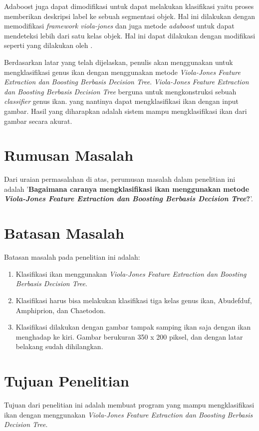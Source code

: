 Adaboost juga dapat dimodifikasi untuk dapat melakukan klasifikasi yaitu proses 
memberikan deskripsi label ke sebuah segmentasi objek. Hal ini dilakukan dengan 
memodifikasi \textit{framework viola-jones} dan juga metode \textit{adaboost} untuk 
dapat mendeteksi lebih dari satu kelas objek. Hal ini dapat dilakukan dengan modifikasi 
seperti yang dilakukan oleh \cite{samme}.

Berdasarkan latar yang telah dijelaskan, penulis akan menggunakan untuk mengklasifikasi
genus ikan dengan menggunakan metode \emph{Viola-Jones Feature Extraction dan Boosting Berbasis 
	Decision Tree}. 
\emph{Viola-Jones Feature Extraction dan Boosting Berbasis 
	Decision Tree} berguna untuk 
mengkonstruksi sebuah \emph{classifier} genus ikan. yang nantinya dapat mengklasifikasi 
ikan dengan input gambar. Hasil yang diharapkan adalah sistem 
mampu mengklasifikasi ikan dari gambar secara akurat.

\section{Rumusan Masalah}
Dari uraian permasalahan di atas, perumusan masalah dalam penelitian ini adalah 
'\textbf{Bagaimana caranya mengklasifikasi ikan menggunakan metode 
\textit{Viola-Jones Feature Extraction dan Boosting Berbasis 
	Decision Tree}?}'.

\section{Batasan Masalah}
Batasan masalah pada penelitian ini adalah:
\begin{enumerate}
	\item Klasifikasi ikan menggunakan \textit{Viola-Jones Feature Extraction dan Boosting Berbasis 
	Decision Tree}.
	\item Klasifikasi harus bisa melakukan klasifikasi tiga kelas genus ikan, Abudefduf, Amphiprion, dan Chaetodon.
	\item Klasifikasi dilakukan dengan gambar tampak samping ikan saja dengan ikan menghadap ke kiri. Gambar 
	berukuran 350 x 200 piksel, dan dengan latar belakang sudah dihilangkan.
\end{enumerate}

\section{Tujuan Penelitian}
	Tujuan dari penelitian ini adalah membuat program yang mampu
	mengklasifikasi ikan dengan menggunakan \textit{Viola-Jones Feature Extraction dan Boosting Berbasis 
	Decision Tree}. 

